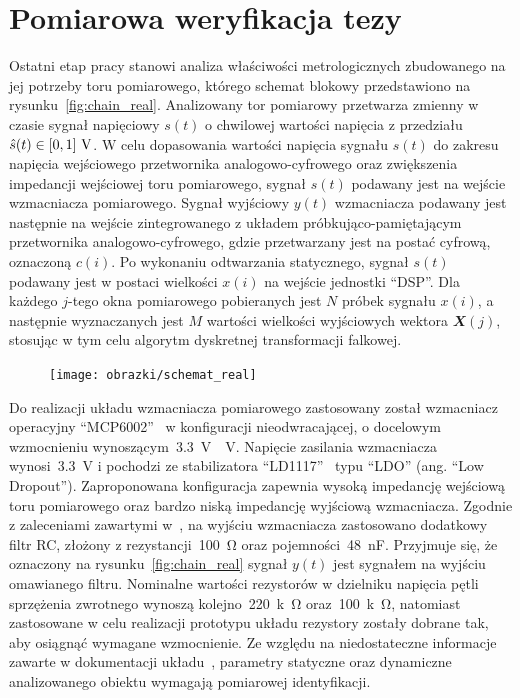 \chapter{Pomiarowa weryfikacja tezy}

Ostatni etap pracy stanowi analiza właściwości metrologicznych zbudowanego na jej potrzeby toru pomiarowego, którego schemat blokowy przedstawiono na rysunku~\ref{fig:chain_real}. Analizowany tor pomiarowy przetwarza zmienny w czasie sygnał napięciowy $s(t)$ o chwilowej wartości napięcia z przedziału $\hat{s}(t) \in \interval{0}{1}~\unit{V}$. W celu dopasowania wartości napięcia sygnału $s(t)$ do zakresu napięcia wejściowego przetwornika analogowo-cyfrowego oraz zwiększenia impedancji wejściowej toru pomiarowego, sygnał $s(t)$ podawany jest na wejście wzmacniacza pomiarowego. Sygnał wyjściowy $y(t)$ wzmacniacza podawany jest następnie na wejście zintegrowanego z układem próbkująco-pamiętającym przetwornika analogowo-cyfrowego, gdzie przetwarzany jest na postać cyfrową, oznaczoną $c(i)$. Po wykonaniu odtwarzania statycznego, sygnał $s(t)$ podawany jest w postaci wielkości $x(i)$ na wejście jednostki \enquote{DSP}. Dla każdego $j$-tego okna pomiarowego pobieranych jest $N$ próbek sygnału $x(i)$, a następnie wyznaczanych jest $M$ wartości wielkości wyjściowych wektora $\mathbfit{X}(j)$, stosując w tym celu algorytm dyskretnej transformacji falkowej.

\begin{figure}[htb!]
\begin{center}
\texttt{[image: obrazki/schemat\_real]}
\end{center}
\end{figure}

Do realizacji układu wzmacniacza pomiarowego zastosowany został wzmacniacz operacyjny \enquote{MCP6002}~\cite{microchip_manual} w konfiguracji nieodwracającej, o docelowym wzmocnieniu wynoszącym~\qty{3.3}{V \per V}. Napięcie zasilania wzmacniacza wynosi~\qty{3.3}{V} i pochodzi ze stabilizatora \enquote{LD1117}~\cite{stm_manual} typu \enquote{LDO} (ang. \enquote{Low Dropout}). Zaproponowana konfiguracja zapewnia wysoką impedancję wejściową toru pomiarowego oraz bardzo niską impedancję wyjściową wzmacniacza. Zgodnie z zaleceniami zawartymi w~\cite{baker_sar, microchip_application}, na wyjściu wzmacniacza zastosowano dodatkowy filtr RC, złożony z rezystancji~\qty{100}{\ohm} oraz pojemności~\qty{48}{nF}. Przyjmuje się, że oznaczony na rysunku~\ref{fig:chain_real} sygnał $y(t)$ jest sygnałem na wyjściu omawianego filtru. Nominalne wartości rezystorów w dzielniku napięcia pętli sprzężenia zwrotnego wynoszą kolejno~\qty{220}{k \ohm} oraz~\qty{100}{k \ohm}, natomiast zastosowane w celu realizacji prototypu układu rezystory zostały dobrane tak, aby osiągnąć wymagane wzmocnienie. Ze względu na niedostateczne informacje zawarte w dokumentacji układu~\cite{microchip_manual}, parametry statyczne oraz dynamiczne analizowanego obiektu wymagają pomiarowej identyfikacji.

